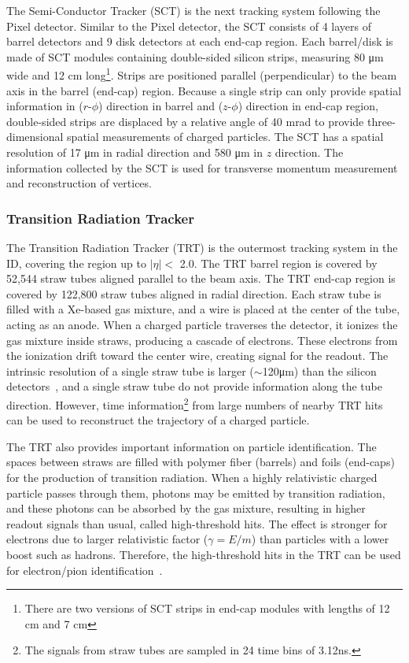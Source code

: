The Semi-Conductor Tracker (SCT) is the next tracking system following the Pixel detector. Similar to the Pixel detector, the SCT consists of 4 layers of barrel detectors and 9 disk detectors at each end-cap region. Each barrel/disk is made of SCT modules containing double-sided silicon strips, measuring 80 \si{\micro\meter} wide and 12 \si{\centi\meter} long\footnote{There are two versions of SCT strips in end-cap modules with lengths of 12 \si{cm} and 7 \si{cm}}. Strips are positioned parallel (perpendicular) to the beam axis in the barrel (end-cap) region. Because a single strip can only provide spatial information in ($r$-$\phi$) direction in barrel and ($z$-$\phi$) direction in end-cap region, double-sided strips are displaced by a relative angle of 40 \si{\milli\radian} to provide three-dimensional spatial measurements of charged particles. The SCT has a spatial resolution of 17 \si{\micro\meter} in radial direction and 580 \si{\micro\meter} in $z$ direction. The information collected by the SCT is used for transverse momentum measurement and reconstruction of vertices.


\subsubsection{Transition Radiation Tracker}
\label{sec:atlas:trt}

The Transition Radiation Tracker (TRT) is the outermost tracking system in the ID, covering the region up to $|\eta| < $ 2.0. The TRT barrel region is covered by 52,544 straw tubes aligned parallel to the beam axis. The TRT end-cap region is covered by 122,800 straw tubes aligned in radial direction. Each straw tube is filled with a Xe-based gas mixture, and a wire is placed at the center of the tube, acting as an anode. When a charged particle traverses the detector, it ionizes the gas mixture inside straws, producing a cascade of electrons. These electrons from the ionization drift toward the center wire, creating signal for the readout. The intrinsic resolution of a single straw tube is larger ($\sim$120\si{\micro\meter}) than the silicon detectors~\cite{Vogel:1537991}, and a single straw tube do not provide information along the tube direction. However, time information\footnote{The signals from straw tubes are sampled in 24 time bins of 3.12\si{\nano\second}.} from large numbers of nearby TRT hits can be used to reconstruct the trajectory of a charged particle.

The TRT also provides important information on particle identification. The spaces between straws are filled with polymer fiber (barrels) and foils (end-caps) for the production of transition radiation. When a highly relativistic charged particle passes through them, photons may be emitted by transition radiation, and these photons can be absorbed by the gas mixture, resulting in higher readout signals than usual, called high-threshold hits. The effect is stronger for electrons due to larger relativistic factor ($\gamma = E/m$) than particles with a lower boost such as hadrons. Therefore, the high-threshold hits in the TRT can be used for electron/pion identification~\cite{ATLAS-CONF-2011-128}.

